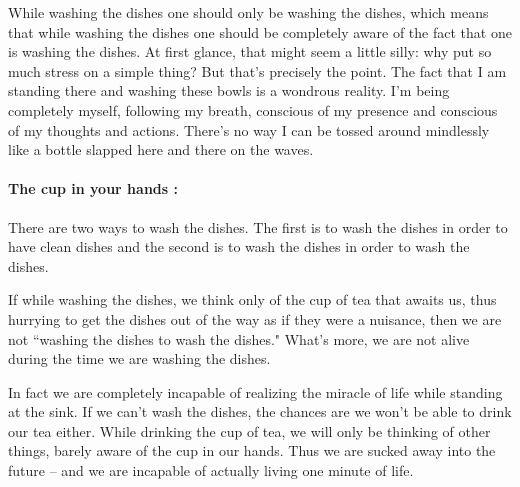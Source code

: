 \documentclass[a4paper,12pt]{article}
\begin{document}
While washing the dishes one should only be washing the dishes, which means that 
while washing the dishes one should be completely aware of the fact that one is 
washing the dishes. At first glance, that might seem a little silly: why put so 
much stress on a simple thing? But that’s precisely the point. The fact that I 
am standing there and washing these bowls is a wondrous 
reality. I'm being completely myself, following my breath, conscious of my 
presence and conscious of my thoughts and actions. There's no way I can be 
tossed around mindlessly like a bottle slapped here and there on the waves.


\paragraph{The cup in your hands :} There are two ways to wash the dishes. 
The first is to wash the dishes in order to have clean dishes and the second is 
to wash the dishes in order to wash the dishes. 

If while washing the dishes, we think only of the cup of tea that awaits us, 
thus hurrying to get the dishes out of the way as if they were a nuisance, then 
we are not ``washing the dishes to wash the dishes." What's more, we are not 
alive during the time we are washing the dishes.

In fact we are completely incapable of realizing the miracle of life while 
standing at the sink. If we can't wash the dishes, the chances are we won't be 
able to drink our tea either. While drinking the cup of tea, we will only be 
thinking of other things, barely aware of the cup in our hands. Thus we are 
sucked away into the future \--- and we are incapable of actually living one 
minute of life.
\end{document}
